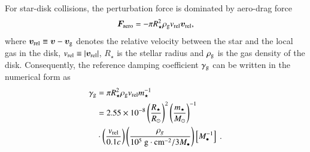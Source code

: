 \documentclass[aps,prx,reprint,superscriptaddress,nofootinbib,longbibliography]{revtex4-1}
\begin{document}
For star-disk collisions, the perturbation force is dominated by aero-drag force~\cite{Wang2024}
\begin{equation}
    \boldsymbol{F}_{\rm aero} = -\pi R_{\star}^2\rho_{\rm g}v_{\rm rel}\boldsymbol{v}_{\rm rel},
    \label{eq:aero drag}
\end{equation}
where $\boldsymbol{v}_{\rm rel}\equiv \boldsymbol{v}-\boldsymbol{v}_{\rm g}$ denotes the relative velocity between the star and the local gas in the disk,  $v_{\rm rel}\equiv\abs{\boldsymbol{v}_{\rm rel}}$, $R_{\star}$ is the stellar radius and $\rho_{\rm g}$ is the gas density of the disk. Consequently, the reference damping coefficient $\gamma_{\rm g}$ can be written in the numerical form as 
\begin{equation}
\begin{aligned}
    \gamma_{\rm g} &=  \pi R_{\star}^2\rho_{\rm g} v_{\rm rel}m_{\star}^{-1} \\ 
    &= 2.55\times 10^{-8}\left(\frac{R_{\star}} {R_{\odot}}\right)^{2}\left(\frac{m_{\star}}{M_{\odot}}\right)^{-1}\\
    &\cdot\left( \frac{v_{\rm rel}}{0.1 c}\right)
    \left(\frac{\rho_g}{ 
    10^{5}\ \mathrm{g\cdot cm^{-2}}/3M_\bullet}\right) \left[M_{\bullet}^{-1}\right]\ .
    \label{eq:aero-drag force gamma}
\end{aligned}
\end{equation}
\end{document}
